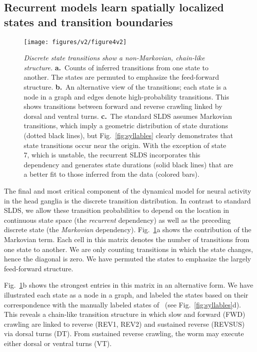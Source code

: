 \documentclass[11pt]{article}
\begin{document}
\clearpage

\subsection*{Recurrent models learn spatially localized states and transition boundaries}

\begin{figure}[t!]
\centering
\texttt{[image: figures/v2/figure4v2]} 
\caption{ \textit{Discrete state transitions show a non-Markovian,
    chain-like structure.}  \textbf{a.}~Counts of inferred transitions
  from one state to another. The states are permuted to emphasize the
  feed-forward structure.  \textbf{b.}~An alternative view of the
  transitions; each state is a node in a graph and edges denote
  high-probability transitions.  This shows transitions between
  forward and reverse crawling linked by dorsal and ventral turns.
  \textbf{c.}~The standard SLDS assumes Markovian transitions, which
  imply a geometric distribution of state durations (dotted black
  lines), but Fig.~\ref{fig:syllables} clearly demonstrates that state
  transitions occur near the origin.  With the exception of state 7,
  which is unstable, the recurrent SLDS incorporates
  this dependency and generates state durations (solid black lines)
  that are a better fit to those inferred from the data (colored
  bars).  }
\label{fig:recurrent}
\end{figure}

The final and most critical component of the dynamical model for
neural activity in the head ganglia is the discrete transition
distribution.  In contrast to standard SLDS, we allow these transition
probabilities to depend on the location in continuous state space (the
\emph{recurrent} dependency) as well as the preceding discrete state
(the \emph{Markovian} dependency).  Fig.~\ref{fig:recurrent}a shows
the contribution of the Markovian term.  Each cell in this matrix
denotes the number of transitions from one state to another. We are
only counting transitions in which the state changes, hence the
diagonal is zero.  We have permuted the states to emphasize the
largely feed-forward structure.

Fig.~\ref{fig:recurrent}b shows the strongest entries in this matrix
in an alternative form.  We have illustrated each state as a node in a
graph, and labeled the states based on their correspondence with the
manually labeled states of~\citet{kato2015global} (see
Fig.~\ref{fig:syllables}d).  This reveals a chain-like transition
structure in which slow and forward (\textsf{FWD}) crawling are linked
to reverse (\textsf{REV1}, \textsf{REV2}) and sustained reverse
(\textsf{REVSUS}) via dorsal turns (\textsf{DT}). From sustained
reverse crawling, the worm may execute either dorsal or ventral turns
(\textsf{VT}).
\end{document}
